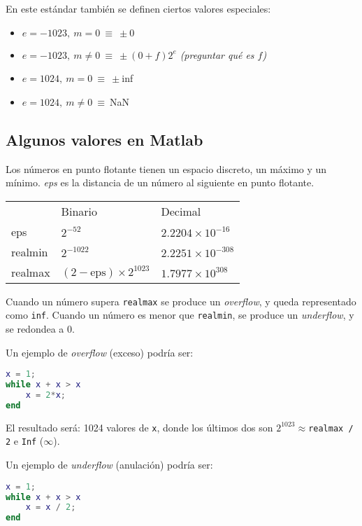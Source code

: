 \documentclass{article}
\begin{document}
En este estándar también se definen ciertos valores especiales:

\begin{itemize}
    \item $e = -1023,\ m=0\ \equiv\ \pm 0$
    \item $e = -1023,\ m\neq 0\ \equiv\ \pm(0+f)2^{e}$ \emph{ (preguntar qué es
    $f$)}
    \item $e = 1024,\ m=0\ \equiv\ \pm$inf
    \item $e = 1024,\ m\neq0\ \equiv\ $NaN
\end{itemize}

\subsection{Algunos valores en Matlab}

Los números en punto flotante tienen un espacio discreto, un máximo y un mínimo.
\textit{eps} es la distancia de un número al siguiente en punto flotante.

\begin{table}[h]
\centering
\begin{tabular}{lll}
        & Binario                        & Decimal \\
eps     & $2^{-52}$                      & $2.2204\times10^{-16}$  \\
realmin & $2^{-1022}$                    & $2.2251\times10^{-308}$ \\
realmax & $(2-\text{eps})\times2^{1023}$ & $1.7977\times10^{308}$
\end{tabular}
\end{table}

Cuando un número supera \verb|realmax| se produce un \textit{overflow}, y queda
representado como \verb|inf|. Cuando un número es menor que \verb|realmin|, se
produce un \textit{underflow}, y se redondea a 0.

Un ejemplo de \textit{overflow} (exceso) podría ser:

\begin{lstlisting}[language=Matlab]
x = 1;
while x + x > x
    x = 2*x;
end
\end{lstlisting}

El resultado será: 1024 valores de \verb|x|, donde los últimos dos son 
$2^{1023}\approx$\verb|realmax / 2| e \verb|Inf| ($\infty$).

Un ejemplo de \textit{underflow} (anulación) podría ser:

\begin{lstlisting}[language=Matlab]
x = 1;
while x + x > x
    x = x / 2;
end
\end{lstlisting}
\end{document}
